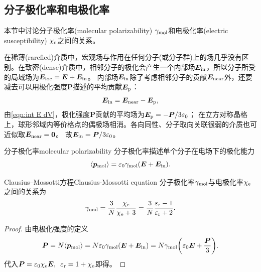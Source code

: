 \subsection{分子极化率和电极化率}
\label{ssec:molecular polarizability and electric susceptibility}

本节中讨论分子极化率(molecular polarizability) $\gamma_{\mathrm{mol}}$和电极化率(electric susceptibility) $\chi_\mathrm e$之间的关系。%

在稀薄(rarefied)介质中，宏观场与作用在任何分子(或分子群)上的场几乎没有区别。在致密(dense)介质中，相邻分子的极化会产生一个内部场$\bm E_{\mathrm{in}}$，所以分子所受的局域场为$\bm E_{\mathrm{loc}} = \bm E + \bm E_{\mathrm{in}}$。
内部场$\bm E_{\mathrm{in}}$除了考虑相邻分子的贡献$\bm E_{\mathrm{near}}$外，还要减去可以用极化强度$\bm P$描述的平均贡献$\bm E_\mathrm p$：
\[
    \bm E_{\mathrm{in}} = \bm E_{\mathrm{near}} - \bm E_\mathrm p,
\]
由\eqref{eqn:int E dV}，极化强度$\bm P$贡献的平均场为$\bm E_\mathrm p = -\bm P/3\varepsilon_0$；
在立方对称晶格上，球形邻域内等价格点的偶极场相消。各向同性、分子取向关联很弱的介质也可近似取$\bm E_{\mathrm{near}} = \bm 0$。
故$\bm E_{\mathrm{in}} = \bm P/3\varepsilon_0$。

\begin{definition}
    {分子极化率}{molecular polarizability}
    分子极化率描述单个分子在电场下的极化能力
    \begin{equation}
        \langle\bm p_{\mathrm{mol}}\rangle = \varepsilon_0\gamma_{\mathrm{mol}}(\bm E + \bm E_{\mathrm{in}}).
    \end{equation}
\end{definition}

\begin{theorem}
    {Clausius--Mossotti方程}{Clausius-Mossotti equation}
    分子极化率$\gamma_{\mathrm{mol}}$与电极化率$\chi_\mathrm e$之间的关系为
    \begin{equation}
        \gamma_{\mathrm{mol}} = \frac3N\frac{\chi_\mathrm e}{\chi_\mathrm e + 3} = \frac3N\frac{\varepsilon_\mathrm r - 1}{\varepsilon_\mathrm r + 2}.
    \end{equation}
\end{theorem}

\begin{proof}
    由电极化强度的定义
    \[
        \bm P = N\langle\bm p_{\mathrm{mol}}\rangle = N\varepsilon_0\gamma_{\mathrm{mol}}(\bm E + \bm E_{\mathrm{in}}) = N\gamma_{\mathrm{mol}}\biggl(\varepsilon_0\bm E + \frac{\bm P}3\biggr).
    \]
    代入$\bm P = \varepsilon_0\chi_\mathrm e\bm E,\enspace\varepsilon_\mathrm r = 1 + \chi_\mathrm e$即得。
\end{proof}

